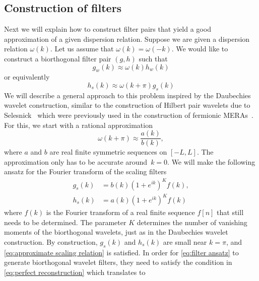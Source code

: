 \documentclass[submission, Phys]{SciPost}
\theoremstyle{definition}
\theoremstyle{remark}
\begin{document}
\begin{appendix}
{\begin{table}
\caption{Comparison of the wavelet-MERA correspondence for fermions and bosons.}
\label{tab:comparison}
\end{table}
}

\section{Construction of filters}\label{sec:filter construction}
Next we will explain how to construct filter pairs that yield a good approximation of a given dispersion relation.
Suppose we are given a dispersion relation $\omega(k)$.
Let us assume that $\omega(k) = \omega(-k)$.
We would like to construct a biorthogonal filter pair $(g,h)$ such that
\begin{equation}\label{eq:rat approx}
  g_w(k) \approx \omega(k) h_w(k)
\end{equation}
or equivalently
\begin{equation}\label{eq:approximate scaling relation}
  h_s(k) \approx \omega(k + \pi) g_s(k)
\end{equation}
We will describe a general approach to this problem inspired by the Daubechies wavelet construction, similar to the construction of Hilbert pair wavelets due to Selesnick~\cite{selesnick2002design} which were previously used in the construction of fermionic MERAs~\cite{haegeman2018rigorous}.
For this, we start with a rational approximation
\begin{equation*}
  \omega(k + \pi) \approx \frac{a(k)}{b(k)},
\end{equation*}
where $a$ and $b$ are real finite symmetric sequences on $[-L,L]$.
The approximation only has to be accurate around~$k=0$.
We will make the following ansatz for the Fourier transform of the scaling filters
\begin{equation}\begin{aligned}\label{eq:filter ansatz}
  g_s(k) &= b(k)(1 + e^{ik})^K f(k), \\
  h_s(k) &= a(k)(1 + e^{ik})^K f(k)
\end{aligned}\end{equation}
where $f(k)$ is the Fourier transform of a real finite sequence $f[n]$ that still needs to be determined.
The parameter $K$ determines the number of vanishing moments of the biorthogonal wavelets, just as in the Daubechies wavelet construction.
By construction, $g_s(k)$ and $h_s(k)$ are small near $k=\pi$, and \cref{eq:approximate scaling relation} is satisfied.
In order for \cref{eq:filter ansatz} to generate biorthogonal wavelet filters, they need to satisfy the condition in \cref{eq:perfect reconstruction} which translates to

\end{appendix}
\end{document}
